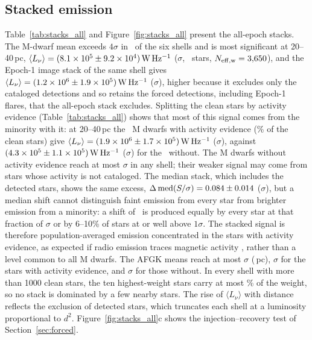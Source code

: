 \documentclass[linenumbers]{aastex702}
\newcommand{\Lnu}{L_\nu}
\newcommand{\WHz}{\mathrm{W\,Hz^{-1}}}
\begin{document}


\subsection{Stacked emission} \label{sec:stacks}

Table~\ref{tab:stacks_all} and Figure~\ref{fig:stacks_all} present the all-epoch stacks. The M-dwarf mean exceeds $4\sigma$ in \NMShellsFour\ of the six shells and is most significant at 20--40\,pc, $\langle\Lnu\rangle=(\AllMSL\pm\AllMSLErr)\,\WHz$ (\AllMSNR$\sigma$, \AllMN\ stars, $N_{\rm eff,w}=3{,}650$), and the Epoch-1 image stack of the same shell gives $\langle\Lnu\rangle=(\StackMSL\pm\StackMSLerr)\,\WHz$ (\StackMSLsnr$\sigma$), higher because it excludes only the cataloged detections and so retains the forced detections, including Epoch-1 flares, that the all-epoch stack excludes. Splitting the clean stars by activity evidence (Table~\ref{tab:stacks_all}) shows that most of this signal comes from the minority with it: at 20--40\,pc the \AllMNAct\ M dwarfs with activity evidence (\ActFracMForty\% of the clean stars) give $\langle\Lnu\rangle=(\AllMSLAct\pm\AllMSLErrAct)\,\WHz$ (\AllMSNRAct$\sigma$), against $(\AllMSLIn\pm\AllMSLErrIn)\,\WHz$ (\AllMSNRIn$\sigma$) for the \AllMNIn\ without. The M dwarfs without activity evidence reach at most \InMmaxSNR$\sigma$ in any shell; their weaker signal may come from stars whose activity is not cataloged. The median stack, which includes the detected stars, shows the same excess, $\Delta\,{\rm med}(S/\sigma)=0.084\pm0.014$ (\AllMDmedSNR$\sigma$), but a median shift cannot distinguish faint emission from every star from brighter emission from a minority: a shift of \AllMDmed\ is produced equally by every star at that fraction of $\sigma$ or by 6--10\% of stars at or well above $1\sigma$. The stacked signal is therefore population-averaged emission concentrated in the stars with activity evidence, as expected if radio emission traces magnetic activity \citep{GudelBenz1993,Gudel2002,Callingham2021,Yiu2024}, rather than a level common to all M dwarfs. The AFGK means reach at most \AllAFGKmaxSNR$\sigma$ (\AllAFGKmaxShell\,pc), \ActAFGKmaxSNR$\sigma$ for the stars with activity evidence, and \InAFGKmaxSNR$\sigma$ for those without. In every shell with more than 1000 clean stars, the ten highest-weight stars carry at most \TopTenMax\% of the weight, so no stack is dominated by a few nearby stars. The rise of $\langle\Lnu\rangle$ with distance reflects the exclusion of detected stars, which truncates each shell at a luminosity proportional to $d^2$. Figure~\ref{fig:stacks_all}c shows the injection--recovery test of Section~\ref{sec:forced}.
\end{document}
